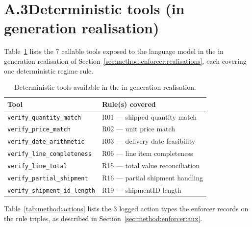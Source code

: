 \section*{A.3\quad Deterministic tools (in generation realisation)}

Table~\ref{tab:method:tools} lists the 7 callable tools exposed to the language model in the in generation realisation of Section~\ref{sec:method:enforcer:realisations}, each covering one deterministic regime rule.

\begin{table}[htbp]
\centering
\caption{Deterministic tools available in the in generation realisation.}
\label{tab:method:tools}
\begin{tabular}{@{}ll@{}}
\toprule
\textbf{Tool} & \textbf{Rule(s) covered} \\
\midrule
\texttt{verify\_quantity\_match}     & R01 --- shipped quantity match       \\
\texttt{verify\_price\_match}        & R02 --- unit price match             \\
\texttt{verify\_date\_arithmetic}    & R03 --- delivery date feasibility    \\
\texttt{verify\_line\_completeness}  & R06 --- line item completeness       \\
\texttt{verify\_line\_total}         & R15 --- total value reconciliation   \\
\texttt{verify\_partial\_shipment}   & R16 --- partial shipment handling    \\
\texttt{verify\_shipment\_id\_length}& R19 --- shipmentID length            \\
\bottomrule
\end{tabular}
\end{table}

Table~\ref{tab:method:actions} lists the 3 logged action types the enforcer records on the rule triples, as described in Section~\ref{sec:method:enforcer:aux}.

